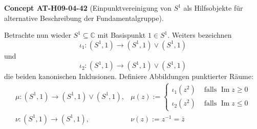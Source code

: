 \documentclass[10pt, letterpaper]{article}
\newcommand{\CustomHeading}[3]{%
  \par\medskip\noindent%
  \textbf{#1 #2} \textnormal{(#3)}.\enskip%
}
\newenvironment{CONC}[2]{\CustomHeading{Concept}{#1}{#2}}{}
\begin{document}
\begin{CONC}{AT-H09-04-42}{Einpunktvereinigung von $S^1$ als Hilfsobjekte für alternative Beschreibung der Fundamentalgruppe}
Betrachte nun wieder $S^{1} \subseteq \mathbb{C}$ mit Basispunkt $1 \in S^{1}$. Weiters bezeichnen 
$$\iota_{1}:\left(S^{1}, 1\right) \rightarrow\left(S^{1}, 1\right) \vee\left(S^{1}, 1\right)$$ 
und 
$$\iota_{2}:\left(S^{1}, 1\right) \rightarrow\left(S^{1}, 1\right) \vee\left(S^{1}, 1\right)$$ 
die beiden kanonischen Inklusionen. Definiere Abbildungen punktierter Räume:
$$
\begin{array}{ll}
\mu:\left(S^{1}, 1\right) \rightarrow\left(S^{1}, 1\right) \vee\left(S^{1}, 1\right), & \mu(z):= \begin{cases}\iota_{1}\left(z^{2}\right) & \text { falls } \operatorname{Im} z \geq 0 \\
\iota_{2}\left(z^{2}\right) & \text { falls } \operatorname{Im} z \leq 0\end{cases} \\
\nu:\left(S^{1}, 1\right) \rightarrow\left(S^{1}, 1\right), & \nu(z):=z^{-1}=\bar{z}
\end{array}
$$
\end{CONC}
\end{document}
